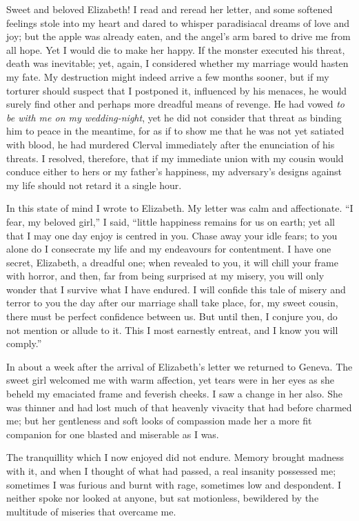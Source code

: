 \documentclass[12pt,openright]{book}
\begin{document}
Sweet and beloved Elizabeth! I read and reread her letter, and some softened feelings stole into my heart and dared to whisper paradisiacal dreams of love and joy; but the apple was already eaten, and the angel’s arm bared to drive me from all hope. Yet I would die to make her happy. If the monster executed his threat, death was inevitable; yet, again, I considered whether my marriage would hasten my fate. My destruction might indeed arrive a few months sooner, but if my torturer should suspect that I postponed it, influenced by his menaces, he would surely find other and perhaps more dreadful means of revenge. He had vowed \textit{to be with me on my wedding-night}, yet he did not consider that threat as binding him to peace in the meantime, for as if to show me that he was not yet satiated with blood, he had murdered Clerval immediately after the enunciation of his threats. I resolved, therefore, that if my immediate union with my cousin would conduce either to hers or my father’s happiness, my adversary’s designs against my life should not retard it a single hour.

In this state of mind I wrote to Elizabeth. My letter was calm and affectionate. “I fear, my beloved girl,” I said, “little happiness remains for us on earth; yet all that I may one day enjoy is centred in you. Chase away your idle fears; to you alone do I consecrate my life and my endeavours for contentment. I have one secret, Elizabeth, a dreadful one; when revealed to you, it will chill your frame with horror, and then, far from being surprised at my misery, you will only wonder that I survive what I have endured. I will confide this tale of misery and terror to you the day after our marriage shall take place, for, my sweet cousin, there must be perfect confidence between us. But until then, I conjure you, do not mention or allude to it. This I most earnestly entreat, and I know you will comply.”

In about a week after the arrival of Elizabeth’s letter we returned to Geneva. The sweet girl welcomed me with warm affection, yet tears were in her eyes as she beheld my emaciated frame and feverish cheeks. I saw a change in her also. She was thinner and had lost much of that heavenly vivacity that had before charmed me; but her gentleness and soft looks of compassion made her a more fit companion for one blasted and miserable as I was.

The tranquillity which I now enjoyed did not endure. Memory brought madness with it, and when I thought of what had passed, a real insanity possessed me; sometimes I was furious and burnt with rage, sometimes low and despondent. I neither spoke nor looked at anyone, but sat motionless, bewildered by the multitude of miseries that overcame me.
\end{document}
